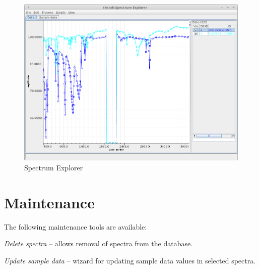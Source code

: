 \documentclass[a4paper]{book}
\begin{document}
\begin{figure}[htb]
  \centering
  \includegraphics[width=12.0cm]{images/spectrum_explorer.png}
  \caption{Spectrum Explorer}
  \label{spectrum_explorer}
\end{figure}

\chapter{Maintenance}
The following maintenance tools are available:
\begin{tight_itemize}
  \item \textit{Delete spectra} -- allows removal of spectra from the database.
  \item \textit{Update sample data} -- wizard for updating sample data values
  in selected spectra.
\end{tight_itemize}


\end{document}
